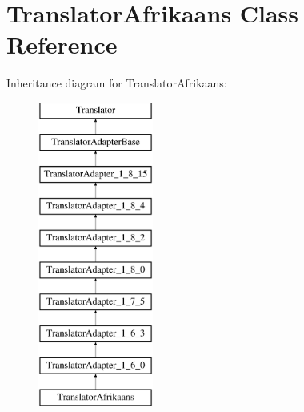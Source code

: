 \hypertarget{class_translator_afrikaans}{}\section{Translator\+Afrikaans Class Reference}
\label{class_translator_afrikaans}
Inheritance diagram for Translator\+Afrikaans\+:\begin{figure}[H]
\begin{center}
\leavevmode
\includegraphics[height=10.000000cm]{class_translator_afrikaans}
\end{center}
\end{figure}
